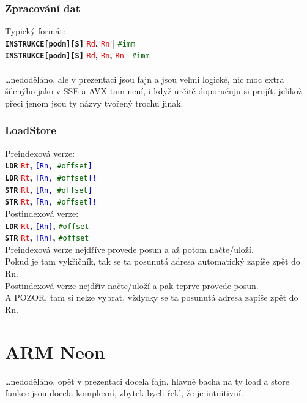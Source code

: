\documentclass[
]{cz_sablona}
\newcommand{\reg}[1]{\texttt{\textcolor{red}{#1}}}
\newcommand{\mem}[1]{\texttt{\textcolor{blue}{#1}}}
\newcommand{\const}[1]{\texttt{\textcolor{darkgreen}{#1}}}
\newcommand{\instr}[1]{\texttt{\textbf{#1}}}
\begin{document}
\subsubsection{Zpracování dat}
Typický formát:\\
\instr{INSTRUKCE[podm][S]} \reg{Rd}\textbf{,} \reg{Rn} | \const{\#imm}\\
\instr{INSTRUKCE[podm][S]} \reg{Rd}\textbf{,} \reg{Rn}\textbf{,} \reg{Rn} | \const{\#imm}\\
\\[0.5em]
\dots nedoděláno, ale v prezentaci jsou fajn a jsou velmi logické,
nic moc extra šílenýho jako v SSE a AVX tam není, i když určitě doporučuju si projít, jelikož
přeci jenom jsou ty názvy tvořený trochu jinak.

\subsubsection{LoadStore}
Preindexová verze:\\
\instr{LDR} \reg{Rt}\textbf{,} \mem{[Rn, \const{\#offset}]}\\
\instr{LDR} \reg{Rt}\textbf{,} \mem{[Rn, \const{\#offset}]!}\\
\instr{STR} \reg{Rt}\textbf{,} \mem{[Rn, \const{\#offset}]}\\
\instr{STR} \reg{Rt}\textbf{,} \mem{[Rn, \const{\#offset}]!}\\
Postindexová verze:\\
\instr{LDR} \reg{Rt}\textbf{,} \mem{[Rn]}\textbf{,} \const{\#offset}\\
\instr{STR} \reg{Rt}\textbf{,} \mem{[Rn]}\textbf{,} \const{\#offset}\\
Preindexová verze nejdříve provede posun a až potom načte/uloží.\\
Pokud je tam vykřičník, tak se ta posunutá adresa automatický zapíše zpět do Rn.\\
Postindexová verze nejdřív načte/uloží a pak teprve provede posun.\\
A POZOR, tam si nelze vybrat, vždycky se ta posunutá adresa zapíše zpět do Rn.

\section{ARM Neon}
\dots nedoděláno, opět v prezentaci docela fajn, hlavně bacha
na ty load a store funkce jsou docela komplexní, zbytek bych řekl, že
je intuitivní.
\end{document}
